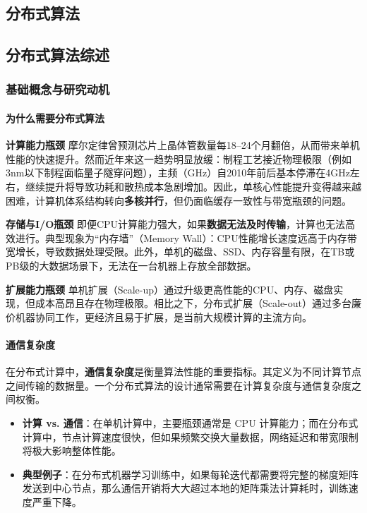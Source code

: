 \documentclass[lang=cn,newtx,10pt,scheme=chinese,chinesefont=nofont,citestyle=gb7714-2015, bibstyle=gb7714-2015]{elegantbook}
\begin{document}
\begin{refsection}
\chapter{分布式算法}
\section{分布式算法综述}

\subsection{基础概念与研究动机}
\subsubsection{为什么需要分布式算法}
\textbf{计算能力瓶颈} \quad
摩尔定律曾预测芯片上晶体管数量每18–24个月翻倍，从而带来单机性能的快速提升。然而近年来这一趋势明显放缓：制程工艺接近物理极限（例如3nm以下制程面临量子隧穿问题），主频（GHz）自2010年前后基本停滞在4GHz左右，继续提升将导致功耗和散热成本急剧增加。因此，单核心性能提升变得越来越困难，计算机体系结构转向\textbf{多核并行}，但仍面临缓存一致性与带宽瓶颈的问题。

\textbf{存储与I/O瓶颈} \quad
即便CPU计算能力强大，如果\textbf{数据无法及时传输}，计算也无法高效进行。典型现象为“内存墙”（Memory Wall）：CPU性能增长速度远高于内存带宽增长，导致数据处理受限。此外，单机的磁盘、SSD、内存容量有限，在TB或PB级的大数据场景下，无法在一台机器上存放全部数据。

\textbf{扩展能力瓶颈} \quad
单机扩展（Scale-up）通过升级更高性能的CPU、内存、磁盘实现，但成本高昂且存在物理极限。相比之下，分布式扩展（Scale-out）通过多台廉价机器协同工作，更经济且易于扩展，是当前大规模计算的主流方向。

\subsubsection{通信复杂度}
在分布式计算中，\textbf{通信复杂度}是衡量算法性能的重要指标。其定义为不同计算节点之间传输的数据量。一个分布式算法的设计通常需要在计算复杂度与通信复杂度之间权衡。

\begin{itemize}
  \item \textbf{计算 vs. 通信}：在单机计算中，主要瓶颈通常是 CPU 计算能力；而在分布式计算中，节点计算速度很快，但如果频繁交换大量数据，网络延迟和带宽限制将极大影响整体性能。
  \item \textbf{典型例子}：在分布式机器学习训练中，如果每轮迭代都需要将完整的梯度矩阵发送到中心节点，那么通信开销将大大超过本地的矩阵乘法计算耗时，训练速度严重下降。
\end{itemize}


\end{refsection}
\end{document}
